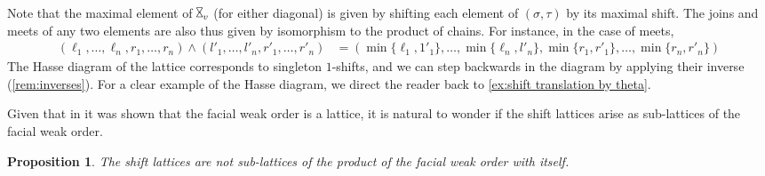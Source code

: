\documentclass{amsart}
\newtheorem{proposition}[theorem]{Proposition}
\theoremstyle{definition}
\newcommand{\hour}{\raisebox{0.065cm}{\rotatebox[origin=c]{90}{$\bowtie$}}_v}
\begin{document}
Note that the maximal element of $\hour$ (for either diagonal) is given by shifting each element of $(\sigma,\tau)$ by its maximal shift.
The joins and meets of any two elements are also thus given by isomorphism to the product of chains.
For instance, in the case of meets,
{\small
\begin{align*}
	(\ell_1,\ldots,\ell_n,r_1,\ldots,r_n)\land (l'_1,\ldots,l'_n,r'_1,\ldots,r'_n) &= (\min\{\ell_1,1'_1\},\ldots,\min\{\ell_n,l'_n\},\min\{r_1,r'_1\},\ldots,\min\{r_n,r'_n\})
\end{align*}
}
The Hasse diagram of the lattice corresponds to singleton $1$-shifts, and we can step backwards in the diagram by applying their inverse (\cref{rem:inverses}).
For a clear example of the Hasse diagram, we direct the reader back to \cref{ex:shift translation by theta}.

Given that in \cite{dermenjian2018facial} it was shown that the facial weak order is a lattice, it is natural to wonder if the shift lattices arise as sub-lattices of the facial weak order.

\begin{proposition}
The shift lattices are not sub-lattices of the product of the facial weak order with itself.
\end{proposition}
\end{document}
